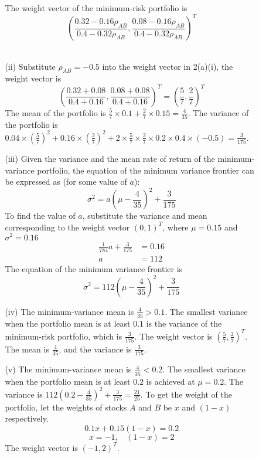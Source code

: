 \documentclass{article}
\begin{document}
\begin{enumerate}
\begin{itemize}
\begin{itemize}
The weight vector of the minimum-risk portfolio is 
\[\left(\frac{0.32-0.16\rho_{AB}}{0.4-0.32\rho_{AB}}, \frac{0.08-0.16\rho_{AB}}{0.4-0.32\rho_{AB}}\right)^T\]
\\
\item[(ii)]
Substitute $\rho_{AB}=-0.5$ into the weight vector in 2(a)(i), the weight vector is
\[\left(\frac{0.32+0.08}{0.4+0.16}, \frac{0.08+0.08}{0.4+0.16}\right)^T=\left(\frac{5}{7}, \frac{2}{7}\right)^T\]
The mean of the portfolio is $\frac{5}{7} \times 0.1 + \frac{2}{7} \times 0.15 = \frac{4}{35}$.
\newline
The variance of the portfolio is $0.04 \times (\frac{5}{7})^2 + 0.16 \times (\frac{2}{7})^2+2 \times \frac{5}{7} \times \frac{2}{7} \times 0.2 \times 0.4 \times (-0.5)=\frac{3}{175}$.
\\
\item[(iii)]
Given the variance and the mean rate of return of the minimum-variance portfolio, the equation of the minimum variance frontier can be expressed as (for some value of $a$):
\[\sigma^2=a\left(\mu-\frac{4}{35}\right)^2+\frac{3}{175}\]
To find the value of $a$, substitute the variance and mean corresponding to the weight vector $(0, 1)^T$, where $\mu = 0.15$ and $\sigma^2=0.16$
\begin{align*}
\frac{1}{784}a+\frac{3}{175}&=0.16 \\
a&=112 
\end{align*}
The equation of the minimum variance frontier is
\[\sigma^2=112\left(\mu-\frac{4}{35}\right)^2+\frac{3}{175}\]

\item[(iv)]
The minimum-variance mean is $\frac{4}{35}>0.1$. 
\newline
The smallest variance when the portfolio mean is at least $0.1$ is the variance of the minimum-risk portfolio, which is $\frac{3}{175}$.
\newline
The weight vector is $(\frac{5}{7}, \frac{2}{7})^T$.
\newline
The mean is $\frac{4}{35}$, and the variance is $\frac{3}{175}$.\\
\item[(v)]
The minimum-variance mean is $\frac{4}{35}<0.2$.
\newline
The smallest variance when the portfolio mean is at least $0.2$ is achieved at $\mu = 0.2$.
\newline
The variance is $112(0.2-\frac{4}{35})^2+\frac{3}{175}=\frac{21}{25}$.
\newline
To get the weight of the portfolio, let the weights of stocks $A$ and $B$ be $x$ and $(1-x)$ respectively.
\[0.1x+0.15(1-x)=0.2\]
\[x=-1, \ \ \ \ (1-x)=2\]
The weight vector is $(-1, 2)^T$.
\end{itemize}


\end{itemize}
\end{enumerate}
\end{document}
